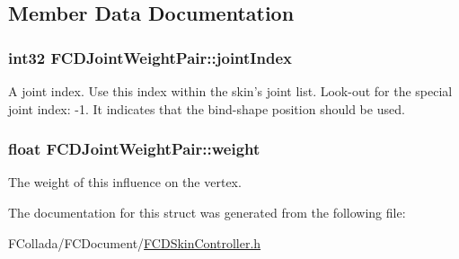 \subsection{Member Data Documentation}
\hypertarget{structFCDJointWeightPair_a12f6483d8748e4cca1089064b1934a3b}{
\subsubsection[{jointIndex}]{\setlength{\rightskip}{0pt plus 5cm}int32 {\bf FCDJointWeightPair::jointIndex}}}
\label{structFCDJointWeightPair_a12f6483d8748e4cca1089064b1934a3b}
A joint index. Use this index within the skin's joint list. Look-\/out for the special joint index: -\/1. It indicates that the bind-\/shape position should be used. \hypertarget{structFCDJointWeightPair_a375a6320fef00a704bbdaf67097f8552}{
\subsubsection[{weight}]{\setlength{\rightskip}{0pt plus 5cm}float {\bf FCDJointWeightPair::weight}}}
\label{structFCDJointWeightPair_a375a6320fef00a704bbdaf67097f8552}
The weight of this influence on the vertex. 

The documentation for this struct was generated from the following file:\begin{DoxyCompactItemize}
\item 
FCollada/FCDocument/\hyperlink{FCDSkinController_8h}{FCDSkinController.h}\end{DoxyCompactItemize}
